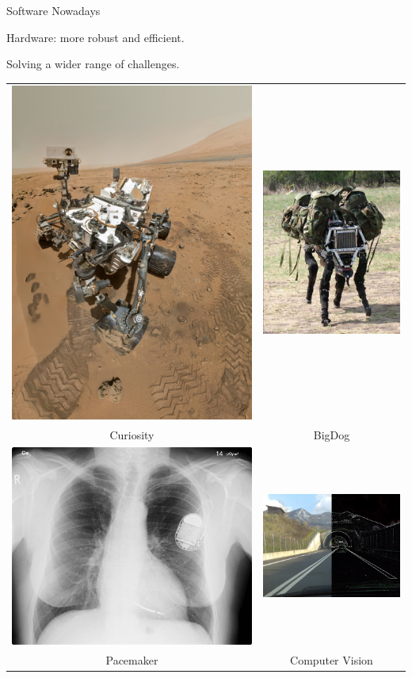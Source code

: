 \documentclass[xcolor={usenames,dvipsnames}]{beamer}
\begin{document}
\begin{frame}{Software Nowadays}

  Hardware: more robust and efficient.

  {\hfill Solving a wider range of challenges.}

  \begin{center}
  \begin{tabular}{cc}
    \includegraphics[width=.2\textwidth]{res/curiosity.jpg} &
    \includegraphics[width=.2\textwidth]{res/robot.jpg} \\
    {\footnotesize Curiosity} & {\footnotesize BigDog} \\
    \includegraphics[width=.2\textwidth]{res/pacemaker.jpg} &
    \includegraphics[width=.2\textwidth]{res/road.jpg} \\
    {\footnotesize Pacemaker} & {\footnotesize Computer Vision}
  \end{tabular}
  \end{center}

\end{frame}
\end{document}
